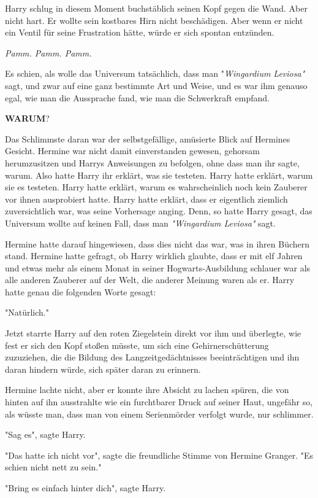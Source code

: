 {Harry schlug in diesem Moment buchstäblich seinen Kopf gegen die Wand. Aber nicht hart. Er wollte sein kostbares Hirn nicht beschädigen. Aber wenn er nicht ein Ventil für seine Frustration hätte, würde er sich spontan entzünden.

\emph{Pamm. Pamm. Pamm.}

Es schien, als wolle das Universum tatsächlich, dass man "\emph{Wingardium Leviosa"} sagt, und zwar auf eine ganz bestimmte Art und Weise, und es war ihm genauso egal, wie man die Aussprache fand, wie man die Schwerkraft empfand.

\textbf{WARUM}?

Das Schlimmste daran war der selbstgefällige, amüsierte Blick auf Hermines Gesicht. Hermine war nicht damit einverstanden gewesen, gehorsam herumzusitzen und Harrys Anweisungen zu befolgen, ohne dass man ihr sagte, warum. Also hatte Harry ihr erklärt, was sie testeten. Harry hatte erklärt, warum sie es testeten. Harry hatte erklärt, warum es wahrscheinlich noch kein Zauberer vor ihnen ausprobiert hatte. Harry hatte erklärt, dass er eigentlich ziemlich zuversichtlich war, was seine Vorhersage anging. Denn, so hatte Harry gesagt, das Universum wollte auf keinen Fall, dass man \emph{"Wingardium Leviosa"} sagt.

Hermine hatte darauf hingewiesen, dass dies nicht das war, was in ihren Büchern stand. Hermine hatte gefragt, ob Harry wirklich glaubte, dass er mit elf Jahren und etwas mehr als einem Monat in seiner Hogwarts-Ausbildung schlauer war als alle anderen Zauberer auf der Welt, die anderer Meinung waren als er. Harry hatte genau die folgenden Worte gesagt:

"Natürlich."

Jetzt starrte Harry auf den roten Ziegelstein direkt vor ihm und überlegte, wie fest er sich den Kopf stoßen müsste, um sich eine Gehirnerschütterung zuzuziehen, die die Bildung des Langzeitgedächtnisses beeinträchtigen und ihn daran hindern würde, sich später daran zu erinnern.

Hermine lachte nicht, aber er konnte ihre Absicht zu lachen spüren, die von hinten auf ihn ausstrahlte wie ein furchtbarer Druck auf seiner Haut, ungefähr so, als wüsste man, dass man von einem Serienmörder verfolgt wurde, nur schlimmer.

"Sag es", sagte Harry.

"Das hatte ich nicht vor", sagte die freundliche Stimme von Hermine Granger. "Es schien nicht nett zu sein."

"Bring es einfach hinter dich", sagte Harry.

}
